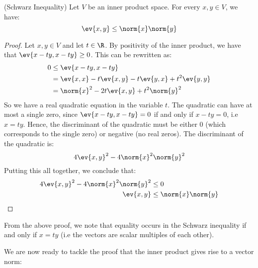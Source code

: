 \begin{proposition}
  (Schwarz Inequality) Let \( V \) be an inner product space. For every \( x,y\in V \), we have:
  \[ \ev{x,y}\leq \norm{x}\norm{y} \]
\end{proposition}
\begin{proof}
  Let \( x,y\in V \) and let \( t\in\R \). By positivity of the inner product, we have that \( \ev{x-ty,x-ty}\geq 0 \). This can be rewritten as:
  \begin{align*}
    0&\leq \ev{x-ty,x-ty}\\
    &= \ev{x,x}-t\ev{x,y}-t\ev{y,x}+t^2\ev{y,y}\\
    &= \norm{x}^2-2t\ev{x,y}+t^2\norm{y}^2
  \end{align*}
  So we have a real quadratic equation in the variable \( t \). The quadratic can have at most a single zero, since \( \ev{x-ty,x-ty}=0 \) if and only if \( x-ty=0 \), i.e \( x=ty \). Hence, the discriminant of the quadratic must be either 0 (which corresponds to the single zero) or negative (no real zeros). The discriminant of the quadratic is:
  \[ 4\ev{x,y}^2-4\norm{x}^2\norm{y}^2 \]
  Putting this all together, we conclude that:
  \begin{align*}
    4\ev{x,y}^2-4\norm{x}^2\norm{y}^2&\leq 0\\
    \ev{x,y}&\leq\norm{x}\norm{y}
  \end{align*}
\end{proof}

From the above proof, we note that equality occurs in the Schwarz inequality if and only if \( x=ty \) (i.e the vectors are scalar multiples of each other).

\vspace{3mm}

We are now ready to tackle the proof that the inner product gives rise to a vector norm:

